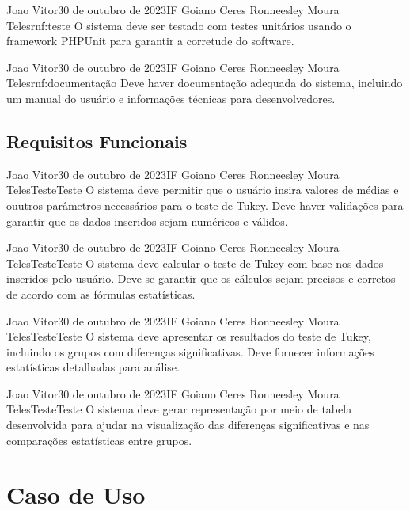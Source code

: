 {Joao Vitor}{30 de outubro de 2023}{IF Goiano Ceres}
{Ronneesley Moura Teles}{rnf:teste}
{O sistema deve ser testado com testes unitários usando o framework PHPUnit para garantir a corretude do software.}

{Joao Vitor}{30 de outubro de 2023}{IF Goiano Ceres}
{Ronneesley Moura Teles}{rnf:documentação}
{Deve haver documentação adequada do sistema, incluindo um manual do usuário e informações técnicas para desenvolvedores.}


\subsection{Requisitos Funcionais}

{Joao Vitor}{30 de outubro de 2023}{IF Goiano Ceres}
{Ronneesley Moura Teles}{Teste}{Teste}
{O sistema deve permitir que o usuário insira valores de médias e ouutros parâmetros necessários para o teste de Tukey. Deve haver validações para garantir que os dados inseridos sejam numéricos e válidos.}

{Joao Vitor}{30 de outubro de 2023}{IF Goiano Ceres}
{Ronneesley Moura Teles}{Teste}{Teste}
{O sistema deve calcular o teste de Tukey com base nos dados inseridos pelo usuário.
Deve-se garantir que os cálculos sejam precisos e corretos de acordo com as fórmulas estatísticas.}

{Joao Vitor}{30 de outubro de 2023}{IF Goiano Ceres}
{Ronneesley Moura Teles}{Teste}{Teste}
{O sistema deve apresentar os resultados do teste de Tukey, incluindo os grupos com diferenças significativas.
Deve fornecer informações estatísticas detalhadas para análise.}

{Joao Vitor}{30 de outubro de 2023}{IF Goiano Ceres}
{Ronneesley Moura Teles}{Teste}{Teste}
{O sistema deve gerar representação por meio de tabela desenvolvida para ajudar na visualização das diferenças significativas e nas comparações estatísticas entre grupos.}

\section{Caso de Uso}

